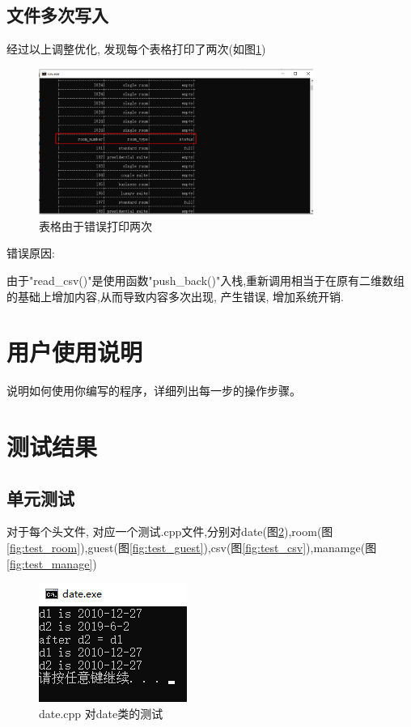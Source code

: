 \documentclass[UTF8]{ctexart}
\begin{document}
  \subsection{文件多次写入}
    经过以上调整优化, 发现每个表格打印了两次(如图\ref{fig:bug_3})
    \begin{figure}[H]
      \centering
      \includegraphics[width=0.8\textwidth]{bug_3}
      \caption{表格由于错误打印两次}
      \label{fig:bug_3}
    \end{figure}

    错误原因:

    由于"read\_csv()"是使用函数"push\_back()"入栈,重新调用相当于在原有二维数组的基础上增加内容,从而导致内容多次出现, 产生错误, 增加系统开销.


\section{用户使用说明}
  说明如何使用你编写的程序，详细列出每一步的操作步骤。
\section{测试结果}
  \subsection{单元测试}
    对于每个头文件, 对应一个测试.cpp文件,分别对date(图\ref{fig:test_date}),room(图\ref{fig:test_room}),guest(图\ref{fig:test_guest}),csv(图\ref{fig:test_csv}),manamge(图\ref{fig:test_manage})
    \begin{figure}[H]
      \centering
      \includegraphics[scale=1]{test_date}
      \caption{date.cpp 对date类的测试}
      \label{fig:test_date}
    \end{figure}
\end{document}

